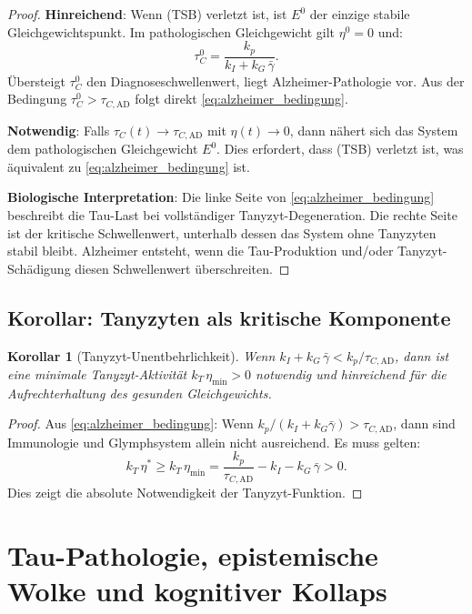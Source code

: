﻿\documentclass[12pt,a4paper]{article}
\newtheorem{corollary}[theorem]{Korollar}
\theoremstyle{definition}
\begin{document}
	\begin{proof}
		\textbf{Hinreichend}: Wenn (TSB) verletzt ist, ist $E^0$ der einzige stabile Gleichgewichtspunkt. Im pathologischen Gleichgewicht gilt $\eta^0 = 0$ und:
		\[
		\tau_C^0 = \frac{k_p}{k_I + k_G\,\bar{\gamma}}.
		\]
		Übersteigt $\tau_C^0$ den Diagnoseschwellenwert, liegt Alzheimer-Pathologie vor. Aus der Bedingung $\tau_C^0 > \tau_{C,\text{AD}}$ folgt direkt \eqref{eq:alzheimer_bedingung}.
		
		\textbf{Notwendig}: Falls $\tau_C(t) \to \tau_{C,\text{AD}}$ mit $\eta(t) \to 0$, dann nähert sich das System dem pathologischen Gleichgewicht $E^0$. Dies erfordert, dass (TSB) verletzt ist, was äquivalent zu \eqref{eq:alzheimer_bedingung} ist.
		
		\textbf{Biologische Interpretation}: Die linke Seite von \eqref{eq:alzheimer_bedingung} beschreibt die Tau-Last bei vollständiger Tanyzyt-Degeneration. Die rechte Seite ist der kritische Schwellenwert, unterhalb dessen das System ohne Tanyzyten stabil bleibt. Alzheimer entsteht, wenn die Tau-Produktion und/oder Tanyzyt-Schädigung diesen Schwellenwert überschreiten.
	\end{proof}
	
	\subsection{Korollar: Tanyzyten als kritische Komponente}
	
	\begin{corollary}[Tanyzyt-Unentbehrlichkeit]
		\label{cor:tanycyte_essential}
		Wenn $k_I + k_G\,\bar{\gamma} < k_p / \tau_{C,\text{AD}}$, dann ist eine minimale Tanyzyt-Aktivität $k_T\,\eta_{\min} > 0$ notwendig und hinreichend für die Aufrechterhaltung des gesunden Gleichgewichts.
	\end{corollary}
	
	\begin{proof}
		Aus \eqref{eq:alzheimer_bedingung}: Wenn $k_p/(k_I + k_G\bar{\gamma}) > \tau_{C,\text{AD}}$, dann sind Immunologie und Glymphsystem allein nicht ausreichend. Es muss gelten:
		\[
		k_T\,\eta^* \geq k_T\,\eta_{\min} = \frac{k_p}{\tau_{C,\text{AD}}} - k_I - k_G\,\bar{\gamma} > 0.
		\]
		Dies zeigt die absolute Notwendigkeit der Tanyzyt-Funktion.
	\end{proof}
	
	\section{Tau-Pathologie, epistemische Wolke und kognitiver Kollaps}
	\label{sec:integration}
\end{document}
